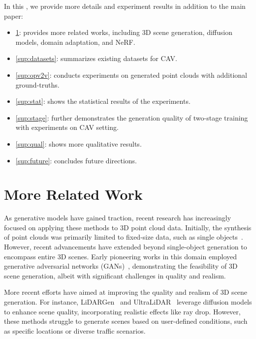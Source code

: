 In this \supp, we provide more details and experiment results in addition to the main paper:
\begin{itemize}
    \item \cref{sup:related}: provides more related works, including 3D scene generation, diffusion models, domain adaptation, and NeRF. 
    \item \cref{sup:datasets}: summarizes existing datasets for CAV.
    \item \cref{sup:opv2v}: conducts experiments on generated point clouds with additional ground-truths.
    \item \cref{sup:stat}: shows the statistical results of the experiments.
    \item \cref{sup:stage}: further demonstrates the generation quality of two-stage training with experiments on CAV setting.
    \item \cref{sup:qual}: shows more qualitative results. 
    \item \cref{sup:future}: concludes future directions.
\end{itemize}

\section{More Related Work}
\label{sup:related}

As generative models have gained traction, recent research has increasingly focused on applying these methods to 3D point cloud data. Initially, the synthesis of point clouds was primarily limited to fixed-size data, such as single objects~\citep{achlioptas2018learning, fan2017point, shu20193d, valsesia2018learning}. However, recent advancements have extended beyond single-object generation to encompass entire 3D scenes. Early pioneering works in this domain employed generative adversarial networks (GANs)~\citep{goodfellow2014generative}, demonstrating the feasibility of 3D scene generation, albeit with significant challenges in quality and realism.

More recent efforts have aimed at improving the quality and realism of 3D scene generation. For instance, LiDARGen~\citep{zyrianov2022learning-lidargen} and UltraLiDAR~\citep{xiong2023ultralidar} leverage diffusion models to enhance scene quality, incorporating realistic effects like ray drop. However, these methods struggle to generate scenes based on user-defined conditions, such as specific locations or diverse traffic scenarios.

